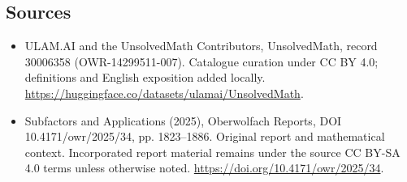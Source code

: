 \documentclass[11pt]{article}
\begin{document}
\subsection{Sources}
\begin{itemize}
\item[\hypertarget{source:30006358:1}{S1}] ULAM.AI and the UnsolvedMath Contributors, UnsolvedMath, record 30006358 (OWR-14299511-007). Catalogue curation under CC BY 4.0; definitions and English exposition added locally.
\url{https://huggingface.co/datasets/ulamai/UnsolvedMath}.
\item[\hypertarget{source:30006358:2}{S2}] Subfactors and Applications (2025), Oberwolfach Reports, DOI 10.4171/owr/2025/34, pp. 1823--1886. Original report and mathematical context. Incorporated report material remains under the source CC BY-SA 4.0 terms unless otherwise noted.
\url{https://doi.org/10.4171/owr/2025/34}.
\end{itemize}
\label{end:30006358}
\end{document}
